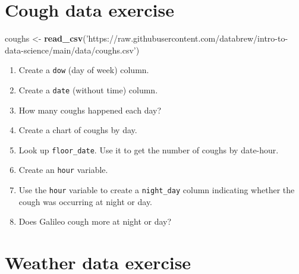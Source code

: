 \documentclass[
]{book}
\newenvironment{Shaded}{\begin{snugshade}}{\end{snugshade}}
\newcommand{\DataTypeTok}[1]{\textcolor[rgb]{0.13,0.29,0.53}{#1}}
\newcommand{\KeywordTok}[1]{\textcolor[rgb]{0.13,0.29,0.53}{\textbf{#1}}}
\newcommand{\NormalTok}[1]{#1}
\newcommand{\OperatorTok}[1]{\textcolor[rgb]{0.81,0.36,0.00}{\textbf{#1}}}
\newcommand{\StringTok}[1]{\textcolor[rgb]{0.31,0.60,0.02}{#1}}
\begin{document}
\hypertarget{cough-data-exercise}{%
\section*{Cough data exercise}\label{cough-data-exercise}}

\begin{Shaded}
\begin{Highlighting}[]
\NormalTok{coughs <-}\StringTok{ }\KeywordTok{read_csv}\NormalTok{(}\StringTok{'https://raw.githubusercontent.com/databrew/intro-to-data-science/main/data/coughs.csv'}\NormalTok{)}
\end{Highlighting}
\end{Shaded}

\begin{enumerate}
\def\labelenumi{\arabic{enumi}.}
\item
  Create a \texttt{dow} (day of week) column.
\item
  Create a \texttt{date} (without time) column.
\item
  How many coughs happened each day?
\item
  Create a chart of coughs by day.
\item
  Look up \texttt{floor\_date}. Use it to get the number of coughs by date-hour.
\item
  Create an \texttt{hour} variable.
\item
  Use the \texttt{hour} variable to create a \texttt{night\_day} column indicating whether the cough was occurring at night or day.
\item
  Does Galileo cough more at night or day?
\end{enumerate}

\hypertarget{weather-data-exercise}{%
\section*{Weather data exercise}\label{weather-data-exercise}}

\begin{Shaded}
\end{Shaded}
\end{document}
